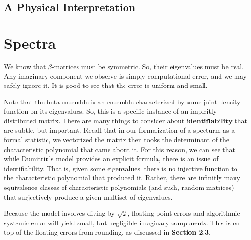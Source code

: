 \dumitriuALGORITHMunnum


\subsection{A Physical Interpretation}






\newpage
\section{Spectra}

We know that $\beta$-matrices must be symmetric. So, their eigenvalues must be real. Any imaginary component we observe is simply computational error, and we may safely ignore it. It is good to see that the error is uniform and small.

\begin{remark}
Note that the beta ensemble is an ensemble characterized by some joint density function on its eigenvalues. So, this is a specific instance of an implcitly distributed matrix. There are many things to consider about $\textbf{identifiability}$ that are subtle, but important. Recall that in our formalization of a specturm as a formal statistic, we vectorized the matrix then tooks the determinant of the characteristic polynomial that came about it. For this reason, we can see that while Dumitriu's model provides an explicit formula, there is an issue of identifiability. That is, given some eigenvalues, there is no injective function to the characteristic polynomial that produced it. Rather, there are infinitly many equivalence classes of characteristic polynomials (and such, random matrices) that surjectively produce a given multiset of eigenvalues.
\end{remark}

\begin{remark}
Because the model involves diving by $\sqrt{2}$, floating point errors and algorithmic systemic error will yield small, but negligible imaginary components. This is on top of the floating errors from rounding, as discussed in \textbf{Section 2.3}.
\end{remark}

